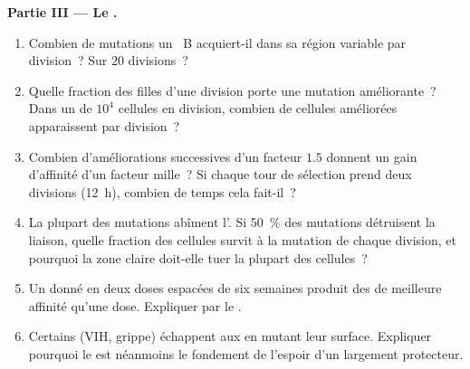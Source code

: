 \begin{problem}
\medskip
\noindent\textbf{Partie III --- Le .}
\begin{enumerate}[resume]
  \item Combien de mutations un ~B acquiert-il dans sa région
        variable par division~? Sur $20$ divisions~?
  \item Quelle fraction des filles d'une division porte une mutation
        améliorante~? Dans un  de $10^{4}$ cellules en
        division, combien de cellules améliorées apparaissent par
        division~?
  \item Combien d'améliorations successives d'un facteur $1.5$ donnent
        un gain d'affinité d'un facteur mille~? Si chaque tour de
        sélection prend deux divisions (\qty{12}{h}), combien de temps
        cela fait-il~?
  \item La plupart des mutations abîment l'. Si \qty{50}{\%}
        des mutations détruisent la liaison, quelle fraction des
        cellules survit à la mutation de chaque division, et pourquoi la
        zone claire doit-elle tuer la plupart des cellules~?
  \item Un  donné en deux doses espacées de six semaines produit
        des  de meilleure affinité qu'une dose. Expliquer par
        le .
  \item Certains  (VIH, grippe) échappent aux  en mutant
        leur surface. Expliquer pourquoi le  est
        néanmoins le fondement de l'espoir d'un  largement
        protecteur.
\end{enumerate}


\end{problem}
